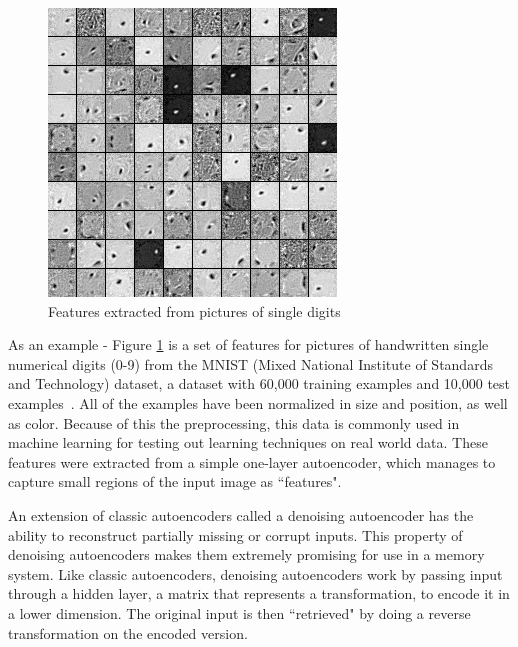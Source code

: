 \documentclass{sig-alternate}
\begin{document}
\begin{figure}[h]
	\begin{center}
		\includegraphics[width=0.75\linewidth]{filters_corruption_30.png}
	\end{center}
	\vspace{-12pt}
	\caption{Features extracted from pictures of single digits}
	\label{fig:features}
\end{figure}

As an example - Figure \ref{fig:features} is a set of features for pictures of handwritten single 
numerical digits (0-9) from the MNIST (Mixed National Institute of Standards and Technology) dataset, 
a dataset with 60,000 training examples and 10,000 test examples~\cite{denoise}. 
All of the examples have been normalized in size and position, as well as 
color. Because of this the preprocessing, this data is commonly used in machine learning for testing out learning 
techniques on real world data.  These features were extracted from a simple one-layer autoencoder, 
which manages to capture small regions of the input image as ``features". 

An extension of classic autoencoders called a denoising autoencoder has the ability to reconstruct 
partially missing or corrupt inputs. This property of denoising autoencoders makes them extremely 
promising for use in a memory system. Like classic autoencoders, 
denoising autoencoders work by passing input through a hidden 
layer, a matrix that represents a transformation, to encode it in a lower dimension. The original 
input is then ``retrieved" by doing a reverse transformation on the encoded version.~\cite{denoise}
\end{document}
